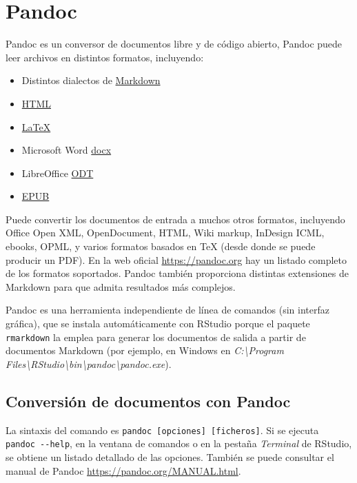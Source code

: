 \documentclass[
]{book}
\theoremstyle{break}
\theoremstyle{nonumberplain}
\begin{document}
\appendix


\chapter{Pandoc}\label{pandoc}

Pandoc es un conversor de documentos libre y de código abierto,
Pandoc puede leer archivos en distintos formatos, incluyendo:

\begin{itemize}
\item
  Distintos dialectos de \href{http://daringfireball.net/projects/markdown/}{Markdown}
\item
  \href{http://www.w3.org/TR/html40/}{HTML}
\item
  \href{http://www.latex-project.org/}{LaTeX}
\item
  Microsoft Word \href{https://en.wikipedia.org/wiki/Office_Open_XML}{docx}
\item
  LibreOffice \href{http://en.wikipedia.org/wiki/OpenDocument}{ODT}
\item
  \href{http://en.wikipedia.org/wiki/EPUB}{EPUB}
\end{itemize}

Puede convertir los documentos de entrada a muchos otros formatos, incluyendo Office Open XML, OpenDocument, HTML, Wiki markup, InDesign ICML, ebooks, OPML, y varios formatos basados en TeX (desde donde se puede producir un PDF).
En la web oficial \url{https://pandoc.org} hay un listado completo de los formatos soportados.
Pandoc también proporciona distintas extensiones de Markdown para que admita resultados más complejos.

Pandoc es una herramienta independiente de línea de comandos (sin interfaz gráfica), que se instala automáticamente con RStudio porque el paquete \texttt{rmarkdown} la emplea para generar los documentos de salida a partir de documentos Markdown
(por ejemplo, en Windows en \emph{C:\textbackslash Program Files\textbackslash RStudio\textbackslash bin\textbackslash pandoc\textbackslash pandoc.exe}).

\section{Conversión de documentos con Pandoc}\label{conversion}

La sintaxis del comando es \texttt{pandoc\ {[}opciones{]}\ {[}ficheros{]}}. Si se ejecuta \texttt{pandoc\ -\/-help},
en la ventana de comandos o en la pestaña \emph{Terminal} de RStudio, se obtiene un listado detallado de las opciones.
También se puede consultar el manual de Pandoc \url{https://pandoc.org/MANUAL.html}.
\end{document}
